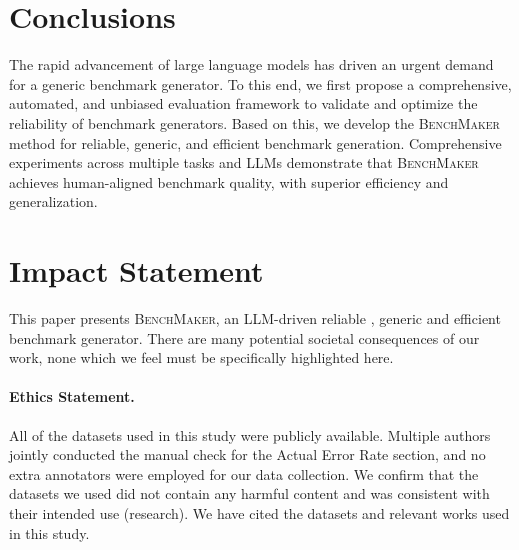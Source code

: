 \section*{Conclusions}
\label{sec:con}
The rapid advancement of large language models has driven an urgent demand for a generic benchmark generator. To this end, we first propose a comprehensive, automated, and unbiased evaluation framework to validate and optimize the reliability of benchmark generators.
Based on this, we develop the \textsc{BenchMaker} method for reliable, generic, and efficient benchmark generation.
Comprehensive experiments across multiple tasks and LLMs demonstrate that \textsc{BenchMaker} achieves human-aligned benchmark quality, with superior efficiency and generalization. 


\section*{Impact Statement}
This paper presents \textsc{BenchMaker}, an LLM-driven reliable , generic and efficient benchmark generator. There
are many potential societal consequences of our work, none
which we feel must be specifically highlighted here.
\paragraph{Ethics Statement.}
All of the datasets used in this study were publicly available. 
Multiple authors jointly conducted the manual check for the Actual Error Rate section, and no extra annotators were employed for our data collection.
We confirm that the datasets we used did not contain any harmful content and was consistent with their intended use (research). We have cited the datasets and relevant works used in this study.